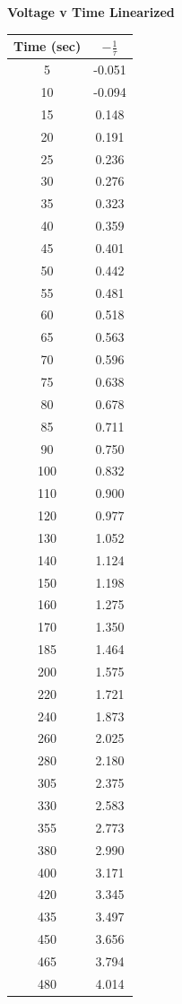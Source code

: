 \documentclass[titlepage]{article}
\begin{document}
	\begin{minipage}[b]{0.5\textwidth}
				\centering
		\textbf{Voltage v Time Linearized}
		\FloatBarrier
				\begin{tabular}{c|c}
					Time (sec) & $-\frac{1}{\tau}$ \\
					\hline
					5   & -0.051  \\
					10  & -0.094  \\
					15  & 0.148   \\
					20  & 0.191   \\
					25  & 0.236   \\
					30  & 0.276   \\
					35  & 0.323   \\
					40  & 0.359   \\
					45  & 0.401   \\
					50  & 0.442   \\
					55  & 0.481   \\
					60  & 0.518   \\
					65  & 0.563   \\
					70  & 0.596   \\
					75  & 0.638   \\
					80  & 0.678   \\
					85  & 0.711   \\
					90  & 0.750   \\
					100 & 0.832   \\
					110 & 0.900   \\
					120 & 0.977   \\
					130 & 1.052   \\
					140 & 1.124   \\
					150 & 1.198   \\
					160 & 1.275   \\
					170 & 1.350   \\
					185 & 1.464   \\
					200 & 1.575   \\
					220 & 1.721   \\
					240 & 1.873   \\
					260 & 2.025   \\
					280 & 2.180   \\
					305 & 2.375   \\
					330 & 2.583   \\
					355 & 2.773   \\
					380 & 2.990   \\
					400 & 3.171   \\
					420 & 3.345   \\
					435 & 3.497   \\
					450 & 3.656   \\
					465 & 3.794   \\
					480 & 4.014  
				\end{tabular}
				\vspace{0.2cm}
			\end{minipage}
\end{document}
